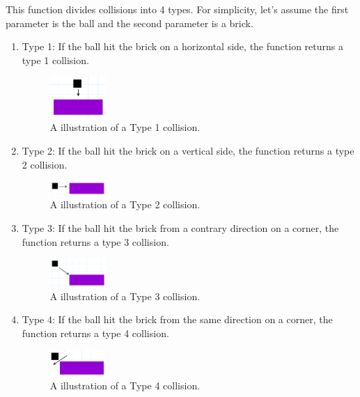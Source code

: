 \documentclass{article}
\begin{document}
This function divides collisions into 4 types. For simplicity, let's assume the first parameter is the ball and the second parameter is a brick.

\begin{enumerate}
    \item Type 1: If the ball hit the brick on a horizontal side, the function returns a type 1 collision.
    \begin{figure}[h!]
        \centering
        \includegraphics[width=0.2\textwidth]{collision_0.png}
        \caption{A illustration of a Type 1 collision.}
    \end{figure}
    \item Type 2: If the ball hit the brick on a vertical side, the function returns a type 2 collision.
    \begin{figure}[h!]
        \centering
        \includegraphics[width=0.2\textwidth]{collision_1.png}
        \caption{A illustration of a Type 2 collision.}
    \end{figure}
    \item Type 3: If the ball hit the brick from a contrary direction on a corner, the function returns a type 3 collision. 
    \begin{figure}[h!]
        \centering
        \includegraphics[width=0.2\textwidth]{collision_2.png}
        \caption{A illustration of a Type 3 collision.}
    \end{figure}
    \item Type 4: If the ball hit the brick from the same direction on a corner, the function returns a type 4 collision.
    \begin{figure}[h!]
        \centering
        \includegraphics[width=0.2\textwidth]{collision_3.png}
        \caption{A illustration of a Type 4 collision.}
    \end{figure}
\end{enumerate}
\end{document}
